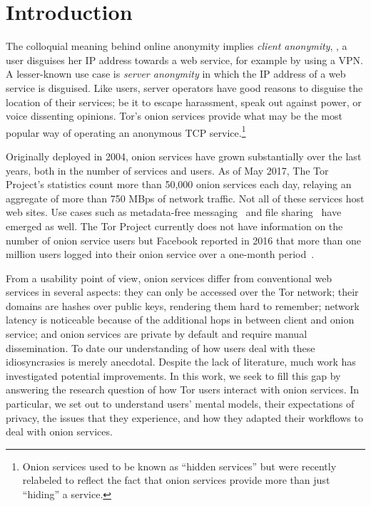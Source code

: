 \section{Introduction}
\label{sec:introduction}

The colloquial meaning behind online anonymity implies \emph{client anonymity},
\ie, a user disguises her IP address towards a web service, for example by using
a VPN.  A lesser-known use case is \emph{server anonymity} in which the IP
address of a web service is disguised.  Like users, server operators have good
reasons to disguise the location of their services; be it to escape harassment,
speak out against power, or voice dissenting opinions.  Tor's onion services
provide what may be the most popular way of operating an anonymous TCP
service.\footnote{Onion services used to be known as ``hidden services'' but
were recently relabeled to reflect the fact that onion services provide more
than just ``hiding'' a service.}

Originally deployed in 2004, onion services have grown substantially over the
last years, both in the number of services and users.  As of May 2017, The Tor
Project's statistics count more than 50,000 onion services each day, relaying an
aggregate of more than 750 MBps of network traffic.  Not all of these services
host web sites.  Use cases such as metadata-free messaging~\cite{ricochet} and
file sharing~\cite{onionshare} have emerged as well.  The Tor Project currently
does not have information on the number of onion service users but Facebook
reported in 2016 that more than one million users logged into their onion
service over a one-month period~\cite{facebook-users}.

From a usability point of view, onion services differ from conventional web
services in several aspects: \first they can only be accessed over the Tor
network; \second their domains are hashes over public keys, rendering them hard
to remember; \third network latency is noticeable because of the additional hops
in between client and onion service; and \fourth onion services are private by
default and require manual dissemination.  To date our
understanding of how users deal with these idiosyncrasies is merely anecdotal.
Despite the lack of literature, much work has investigated potential
improvements.  In this work, we seek to fill this gap by answering the research
question of how Tor users interact with onion services.  In particular, we set
out to understand users' mental models, their expectations of privacy, the issues
that they experience, and how they adapted their workflows to deal with onion
services.

